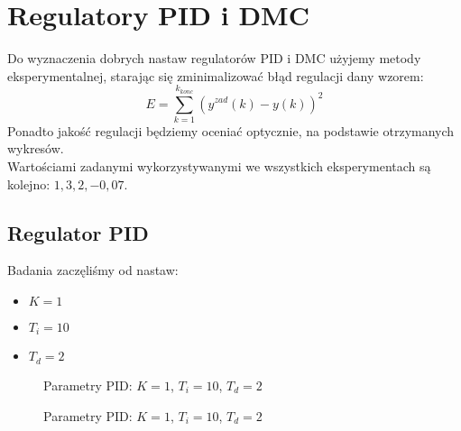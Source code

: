 \chapter{Regulatory PID i DMC}
Do wyznaczenia dobrych nastaw regulatorów PID i DMC użyjemy metody eksperymentalnej, starając się zminimalizować błąd regulacji dany wzorem:
\begin{equation}
E = \sum_{k=1}^{k_{konc}} (y^{zad}(k)-y(k))^2
\end{equation}
Ponadto jakość regulacji będziemy oceniać optycznie, na podstawie otrzymanych wykresów. \\
Wartościami zadanymi wykorzystywanymi we wszystkich eksperymentach są kolejno: $1,3,2,-0,07$.

\section{Regulator PID}
Badania zaczęliśmy od nastaw:
\begin{itemize}
\item $K=1$
\item $T_i=10$
\item $T_d=2$
\end{itemize}

\begin{figure}[H]
\centering
{}
\caption{Parametry PID: $K=1$, $T_i=10$, $T_d=2$}
\label{fig:pid1_y}
\end{figure}

\begin{figure}[H]
\centering
{}
\caption{Parametry PID: $K=1$, $T_i=10$, $T_d=2$}
\label{fig:pid1_u}
\end{figure}


